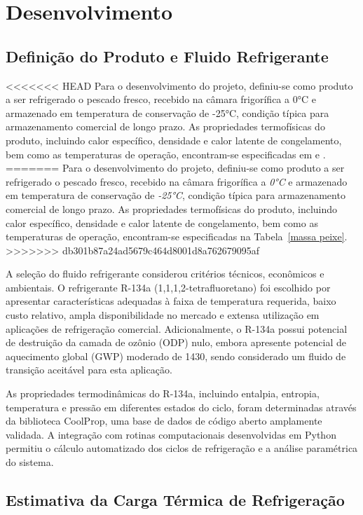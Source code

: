 \chapter{Desenvolvimento}

\section{Definição do Produto e Fluido Refrigerante}

<<<<<<< HEAD
Para o desenvolvimento do projeto, definiu-se como produto a ser refrigerado o pescado fresco, recebido na câmara frigorífica a 0°C e armazenado em temperatura de conservação de -25°C, condição típica para armazenamento comercial de longo prazo. As propriedades termofísicas do produto, incluindo calor específico, densidade e calor latente de congelamento, bem como as temperaturas de operação, encontram-se especificadas em \cite{calor_especifico_II} e \cite{costa1982refrigeracao}.
=======
Para o desenvolvimento do projeto, definiu-se como produto a ser refrigerado o pescado fresco, recebido na câmara frigorífica a \textit{0°C} e armazenado em temperatura de conservação de \textit{-25°C}, condição típica para armazenamento comercial de longo prazo. As propriedades termofísicas do produto, incluindo calor específico, densidade e calor latente de congelamento, bem como as temperaturas de operação, encontram-se especificadas na Tabela~\ref{massa peixe}.
>>>>>>> db301b87a24ad5679c464d8001d8a762679095af

A seleção do fluido refrigerante considerou critérios técnicos, econômicos e ambientais. O refrigerante R-134a (1,1,1,2-tetrafluoretano) foi escolhido por apresentar características adequadas à faixa de temperatura requerida, baixo custo relativo, ampla disponibilidade no mercado e extensa utilização em aplicações de refrigeração comercial. Adicionalmente, o R-134a possui potencial de destruição da camada de ozônio (ODP) nulo, embora apresente potencial de aquecimento global (GWP) moderado de 1430, sendo considerado um fluido de transição aceitável para esta aplicação.

As propriedades termodinâmicas do R-134a, incluindo entalpia, entropia, temperatura e pressão em diferentes estados do ciclo, foram determinadas através da biblioteca CoolProp, uma base de dados de código aberto amplamente validada. A integração com rotinas computacionais desenvolvidas em Python permitiu o cálculo automatizado dos ciclos de refrigeração e a análise paramétrica do sistema.

\section{Estimativa da Carga Térmica de Refrigeração}

